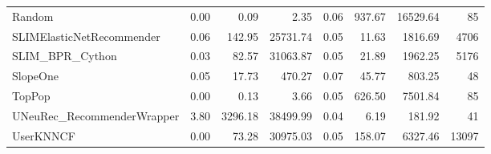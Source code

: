 \begin{tabular}{lrrrrrrr}
Random                             &          0.00 &    0.09 &     2.35 &         0.06 & 937.67 & 16529.64 &         85 \\
SLIMElasticNetRecommender          &          0.06 &  142.95 & 25731.74 &         0.05 &  11.63 &  1816.69 &       4706 \\
SLIM_BPR_Cython                    &          0.03 &   82.57 & 31063.87 &         0.05 &  21.89 &  1962.25 &       5176 \\
SlopeOne                           &          0.05 &   17.73 &   470.27 &         0.07 &  45.77 &   803.25 &         48 \\
TopPop                             &          0.00 &    0.13 &     3.66 &         0.05 & 626.50 &  7501.84 &         85 \\
UNeuRec_RecommenderWrapper         &          3.80 & 3296.18 & 38499.99 &         0.04 &   6.19 &   181.92 &         41 \\
UserKNNCF                          &          0.00 &   73.28 & 30975.03 &         0.05 & 158.07 &  6327.46 &      13097 \\
\bottomrule
\end{tabular}
